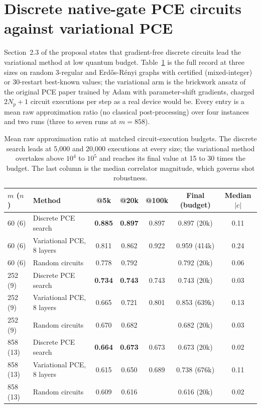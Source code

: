 \documentclass[10pt,a4paper]{article}
\begin{document}
\section{Discrete native-gate PCE circuits against variational PCE}

Section~2.3 of the proposal states that gradient-free discrete circuits lead
the variational method at low quantum budget. Table~\ref{tab:budget} is the
full record at three sizes on random 3-regular and Erd\H{o}s-R\'enyi graphs
with certified (mixed-integer) or 30-restart best-known values; the
variational arm is the brickwork ansatz of the original PCE paper trained by
Adam with parameter-shift gradients, charged $2N_p+1$ circuit executions per
step as a real device would be. Every entry is a mean raw approximation ratio
(no classical post-processing) over four instances and two runs (three to
seven runs at $m=858$).

\begin{table}[h]
\centering
\caption{Mean raw approximation ratio at matched circuit-execution budgets.
The discrete search leads at 5,000 and 20,000 executions at every size; the
variational method overtakes above $10^4$ to $10^5$ and reaches its final
value at 15 to 30 times the budget. The last column is the median correlator
magnitude, which governs shot robustness.}
\label{tab:budget}
\begin{tabular}{llccccc}
\toprule
$m$ ($n$) & Method & @5k & @20k & @100k & Final (budget) & Median $|c|$ \\
\midrule
60 (6) & Discrete PCE search & \textbf{0.885} & \textbf{0.897} & 0.897 & 0.897 (20k) & 0.11 \\
60 (6) & Variational PCE, 8 layers & 0.811 & 0.862 & 0.922 & 0.959 (414k) & 0.24 \\
60 (6) & Random circuits & 0.778 & 0.792 & & 0.792 (20k) & 0.06 \\
252 (9) & Discrete PCE search & \textbf{0.734} & \textbf{0.743} & 0.743 & 0.743 (20k) & 0.03 \\
252 (9) & Variational PCE, 8 layers & 0.665 & 0.721 & 0.801 & 0.853 (639k) & 0.13 \\
252 (9) & Random circuits & 0.670 & 0.682 & & 0.682 (20k) & 0.03 \\
858 (13) & Discrete PCE search & \textbf{0.664} & \textbf{0.673} & 0.673 & 0.673 (20k) & 0.02 \\
858 (13) & Variational PCE, 8 layers & 0.615 & 0.650 & 0.689 & 0.738 (676k) & 0.11 \\
858 (13) & Random circuits & 0.609 & 0.616 & & 0.616 (20k) & 0.02 \\
\bottomrule
\end{tabular}
\end{table}
\end{document}
